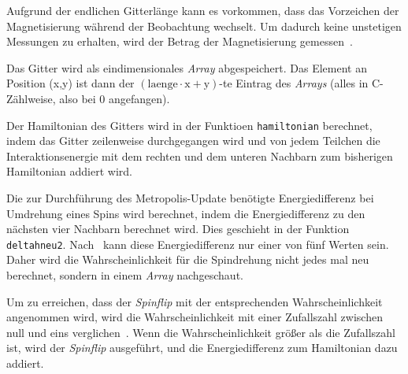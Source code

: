 	Aufgrund der endlichen Gitterlänge kann es vorkommen, dass das Vorzeichen der Magnetisierung während der Beobachtung wechselt. Um dadurch keine unstetigen Messungen zu erhalten, wird der Betrag der Magnetisierung gemessen~\cite[vgl. ][S. 106 ff.]{binderheermann}.%
	
	
	Das Gitter wird als eindimensionales \textit{Array} abgespeichert. Das Element an Position (x,y) ist dann der $(\text{laenge}\cdot\text{x}+\text{y})$-te Eintrag des \textit{Arrays} (alles in C-Zählweise, also bei 0 angefangen).

	Der Hamiltonian des Gitters wird in der Funktioen \texttt{hamiltonian} berechnet, indem das Gitter zeilenweise durchgegangen wird und von jedem Teilchen die Interaktionsenergie mit dem rechten und dem unteren Nachbarn zum bisherigen Hamiltonian addiert wird.
	
	Die zur Durchführung des Metropolis-Update benötigte Energiedifferenz bei Umdrehung eines Spins wird berechnet, indem die Energiedifferenz zu den nächsten vier Nachbarn berechnet wird. Dies geschieht in der Funktion \texttt{deltahneu2}.
	Nach~\cite[S. 103]{binderheermann} kann diese Energiedifferenz nur einer von fünf Werten sein. Daher wird die Wahrscheinlichkeit für die Spindrehung nicht jedes mal neu berechnet, sondern in einem \textit{Array} nachgeschaut.
	
	Um zu erreichen, dass der \textit{Spinflip} mit der entsprechenden Wahrscheinlichkeit angenommen wird, wird die Wahrscheinlichkeit mit einer Zufallszahl zwischen null und eins verglichen~\cite[nach][]{metropolisupdate}. Wenn die Wahrscheinlichkeit größer als die Zufallszahl ist, wird der \textit{Spinflip} ausgeführt, und die Energiedifferenz zum Hamiltonian dazu addiert. 
	
